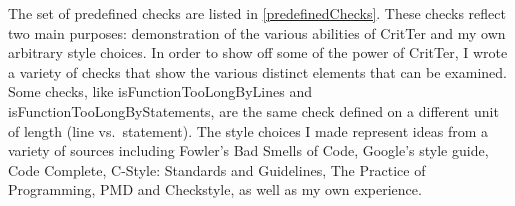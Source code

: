\documentclass[12pt]{report}
\newcommand{\programName}{CritTer\xspace}
\begin{document}
The set of predefined checks are listed in \autoref{predefinedChecks}. These checks reflect 
two main purposes: demonstration of the various abilities of \programName and my own arbitrary style 
choices. In order to show off some of the power of \programName, I wrote a variety of checks that show 
the various distinct elements that can be examined. Some checks, like isFunctionTooLongByLines and 
isFunctionTooLongByStatements, are the same check defined on a different unit of length (line vs.\ 
statement). The style choices I made represent ideas from a variety of sources including Fowler's Bad 
Smells of Code\cite{refactoring}, Google's style guide\cite{googleStyle}, Code Complete\cite{code-
complete}, C-Style: Standards and Guidelines\cite{standards}, The Practice of 
Programming\cite{practice-of-programming}, PMD\cite{pmd} and Checkstyle\cite{checkstyle}, as well as 
my own experience.
\end{document}
